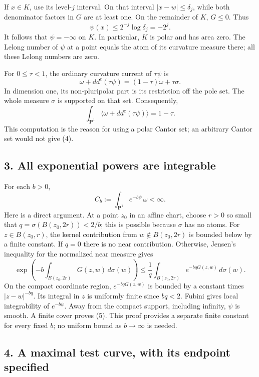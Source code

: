 \documentclass[
]{article}
\begin{document}
If \(x\in K\), use its level-\(j\) interval. On that interval
\(|x-w|\leq\delta_j\), while both denominator factors in \(G\) are at
least one. On the remainder of \(K\), \(G\leq0\). Thus \[
 \psi(x)\leq2^{-j}\log\delta_j=-2^j.
\] It follows that \(\psi=-\infty\) on \(K\). In particular, \(K\) is
polar and has area zero. The Lelong number of \(\psi\) at a point equals
the atom of its curvature measure there; all these Lelong numbers are
zero.

For \(0\leq\tau<1\), the ordinary curvature current of \(\tau\psi\) is
\[
 \omega+dd^c(\tau\psi)=(1-\tau)\omega+\tau\sigma.
\] In dimension one, its non-pluripolar part is its restriction off the
pole set. The whole measure \(\sigma\) is supported on that set.
Consequently, \[
 \int_{\mathbf P^1}\langle\omega+dd^c(\tau\psi)\rangle=1-\tau.
 \tag{4}
\] This computation is the reason for using a polar Cantor set; an
arbitrary Cantor set would not give (4).

\subsection{3. All exponential powers are
integrable}\label{all-exponential-powers-are-integrable}

For each \(b>0\), \[
 C_b:=\int_{\mathbf P^1}e^{-b\psi}\,\omega<\infty.
 \tag{5}
\] Here is a direct argument. At a point \(z_0\) in an affine chart,
choose \(r>0\) so small that \(q=\sigma(B(z_0,2r))<2/b\); this is
possible because \(\sigma\) has no atoms. For \(z\in B(z_0,r)\), the
kernel contribution from \(w\notin B(z_0,2r)\) is bounded below by a
finite constant. If \(q=0\) there is no near contribution. Otherwise,
Jensen's inequality for the normalized near measure gives \[
 \exp\left(-b\int_{B(z_0,2r)}G(z,w)\,d\sigma(w)\right)
 \leq\frac1q\int_{B(z_0,2r)}e^{-bqG(z,w)}\,d\sigma(w).
\] On the compact coordinate region, \(e^{-bqG(z,w)}\) is bounded by a
constant times \(|z-w|^{-bq}\). Its integral in \(z\) is uniformly
finite since \(bq<2\). Fubini gives local integrability of
\(e^{-b\psi}\). Away from the compact support, including infinity,
\(\psi\) is smooth. A finite cover proves (5). This proof provides a
separate finite constant for every fixed \(b\); no uniform bound as
\(b\to\infty\) is needed.

\subsection{4. A maximal test curve, with its endpoint
specified}\label{a-maximal-test-curve-with-its-endpoint-specified}
\end{document}
